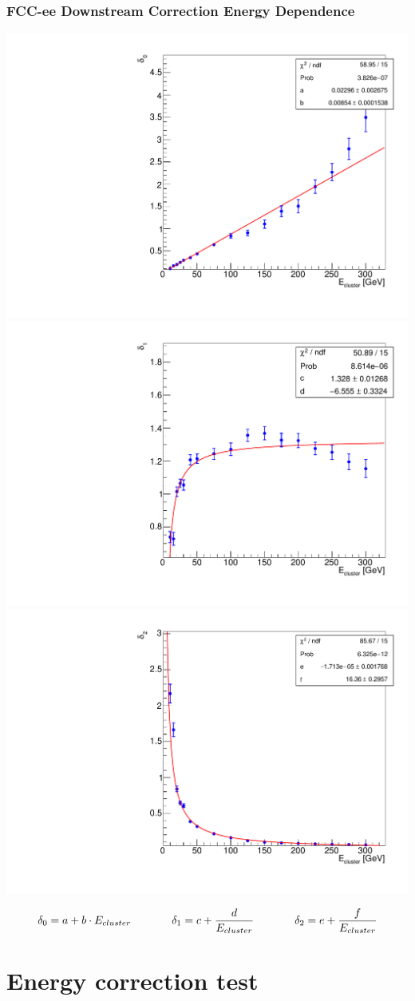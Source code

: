 \documentclass{beamer}
\begin{document}
\begin{frame}
  \frametitle{FCC-ee Downstream Correction Energy Dependence}

  \begin{adjustwidth}{-9mm}{-9mm}
    \includegraphics[width=0.32\linewidth]{figures/12layers/graph_downstream_delta_0.pdf}
    \includegraphics[width=0.32\linewidth]{figures/12layers/graph_downstream_delta_1.pdf}
    \includegraphics[width=0.32\linewidth]{figures/12layers/graph_downstream_delta_2.pdf}\\[-3ex]
  \end{adjustwidth}
  \begin{equation*}
    \delta_0 = a + b \cdot E_{cluster}  \hspace{1.3cm}
    \delta_1 = c + \frac{d}{E_{cluster}} \hspace{1.3cm}
    \delta_2 = e + \frac{f}{E_{cluster}}
  \end{equation*}
\end{frame}


\section{Energy correction test}
\end{document}
